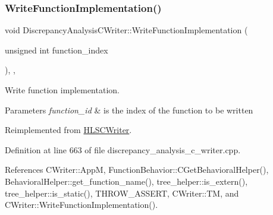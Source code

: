 \subsubsection{\texorpdfstring{Write\+Function\+Implementation()}{WriteFunctionImplementation()}}
{\footnotesize\ttfamily void Discrepancy\+Analysis\+C\+Writer\+::\+Write\+Function\+Implementation (\begin{DoxyParamCaption}\item[{unsigned int}]{function\+\_\+index }\end{DoxyParamCaption})\hspace{0.3cm}{\ttfamily [override]}, {\ttfamily [protected]}, {\ttfamily [virtual]}}



Write function implementation. 


\begin{DoxyParams}{Parameters}
{\em function\+\_\+id} & is the index of the function to be written \\
\hline
\end{DoxyParams}


Reimplemented from \hyperlink{classHLSCWriter_a2379e428afbccc4b235dca4ae28dbaf5}{H\+L\+S\+C\+Writer}.



Definition at line 663 of file discrepancy\+\_\+analysis\+\_\+c\+\_\+writer.\+cpp.



References C\+Writer\+::\+AppM, Function\+Behavior\+::\+C\+Get\+Behavioral\+Helper(), Behavioral\+Helper\+::get\+\_\+function\+\_\+name(), tree\+\_\+helper\+::is\+\_\+extern(), tree\+\_\+helper\+::is\+\_\+static(), T\+H\+R\+O\+W\+\_\+\+A\+S\+S\+E\+RT, C\+Writer\+::\+TM, and C\+Writer\+::\+Write\+Function\+Implementation().

